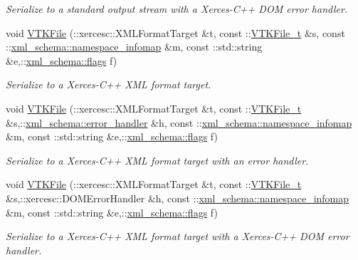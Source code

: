 \begin{DoxyCompactItemize}
\begin{DoxyCompactList}\small\item\em Serialize to a standard output stream with a Xerces-\/\+C++ D\+O\+M error handler. \end{DoxyCompactList}\item 
void \hyperlink{vtk-unstructured_8cpp_aa29105a5170680695be352fa0e00341d}{V\+T\+K\+File} (\+::xercesc\+::\+X\+M\+L\+Format\+Target \&t, const \+::\hyperlink{classVTKFile__t}{V\+T\+K\+File\+\_\+t} \&s, const \+::\hyperlink{namespacexml__schema_ad52b6e3505153cb30ba3452f7868450e}{xml\+\_\+schema\+::namespace\+\_\+infomap} \&m, const \+::std\+::string \&e,\+::\hyperlink{namespacexml__schema_a8d981c127a1f5106d04ad5853e707361}{xml\+\_\+schema\+::flags} f)
\begin{DoxyCompactList}\small\item\em Serialize to a Xerces-\/\+C++ X\+M\+L format target. \end{DoxyCompactList}\item 
void \hyperlink{vtk-unstructured_8cpp_ab09b4a244a093deff01c76e0d066b039}{V\+T\+K\+File} (\+::xercesc\+::\+X\+M\+L\+Format\+Target \&t, const \+::\hyperlink{classVTKFile__t}{V\+T\+K\+File\+\_\+t} \&s,\+::\hyperlink{namespacexml__schema_abdee01986b8e16f04af47dd12038261e}{xml\+\_\+schema\+::error\+\_\+handler} \&h, const \+::\hyperlink{namespacexml__schema_ad52b6e3505153cb30ba3452f7868450e}{xml\+\_\+schema\+::namespace\+\_\+infomap} \&m, const \+::std\+::string \&e,\+::\hyperlink{namespacexml__schema_a8d981c127a1f5106d04ad5853e707361}{xml\+\_\+schema\+::flags} f)
\begin{DoxyCompactList}\small\item\em Serialize to a Xerces-\/\+C++ X\+M\+L format target with an error handler. \end{DoxyCompactList}\item 
void \hyperlink{vtk-unstructured_8cpp_a08394e720690e6ac839c4c06f06fe1c7}{V\+T\+K\+File} (\+::xercesc\+::\+X\+M\+L\+Format\+Target \&t, const \+::\hyperlink{classVTKFile__t}{V\+T\+K\+File\+\_\+t} \&s,\+::xercesc\+::\+D\+O\+M\+Error\+Handler \&h, const \+::\hyperlink{namespacexml__schema_ad52b6e3505153cb30ba3452f7868450e}{xml\+\_\+schema\+::namespace\+\_\+infomap} \&m, const \+::std\+::string \&e,\+::\hyperlink{namespacexml__schema_a8d981c127a1f5106d04ad5853e707361}{xml\+\_\+schema\+::flags} f)
\begin{DoxyCompactList}\small\item\em Serialize to a Xerces-\/\+C++ X\+M\+L format target with a Xerces-\/\+C++ D\+O\+M error handler. \end{DoxyCompactList}\item 

\end{DoxyCompactItemize}
